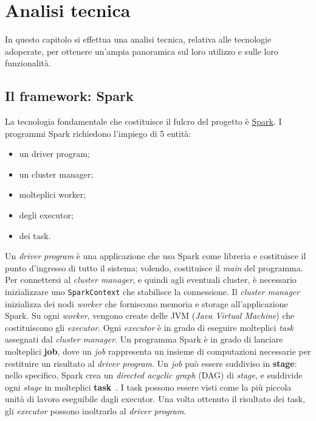 \clearpage
\chapter{Analisi tecnica}\label{ch:technical-analysis}
In questo capitolo si effettua una analisi tecnica, relativa alle tecnologie adoperate, per ottenere un'ampia panoramica sul loro utilizzo e sulle loro funzionalità.

\section{Il framework: Spark}\label{sec:spark}

La tecnologia fondamentale che costituisce il fulcro del progetto è \href{https://spark.apache.org/docs/latest/rdd-programming-guide.html}{Spark}.
I programmi Spark richiedono l'impiego di 5 entità:
\begin{itemize}
    \item un driver program;
    \item un cluster manager;
    \item molteplici worker;
    \item degli executor;
    \item dei task.
\end{itemize}
Un \textit{driver program} è una applicazione che usa Spark come libreria e costituisce il punto d'ingresso di tutto il sistema;
volendo, costituisce il \textit{main} del programma.
Per connettersi al \textit{cluster manager}, e quindi agli eventuali cluster, è necessario inizializzare uno \texttt{SparkContext} che stabilisce la connessione.
Il \textit{cluster manager} inizializza dei nodi \textit{worker} che forniscono memoria e storage all'applicazione Spark.
Su ogni \textit{worker}, vengono create delle JVM (\textit{Java Virtual Machine}) che costituiscono gli \textit{executor}.
Ogni \textit{executor} è in grado di eseguire molteplici \textit{task} assegnati dal \textit{cluster manager}.
Un programma Spark è in grado di lanciare molteplici \textbf{job}, dove un \textit{job} rappresenta un insieme di computazioni necessarie per restituire un risultato al \textit{driver program}.
Un \textit{job} può essere suddiviso in \textbf{stage}: nello specifico, Spark crea un \textit{directed acyclic graph} (DAG) di \textit{stage}, e suddivide ogni \textit{stage} in molteplici \textbf{task}~\cite{big-data-spark}.
I task possono essere visti come la più piccola unità di lavoro eseguibile dagli executor.
Una volta ottenuto il risultato dei task, gli \textit{executor} possono inoltrarlo al \textit{driver program}.

